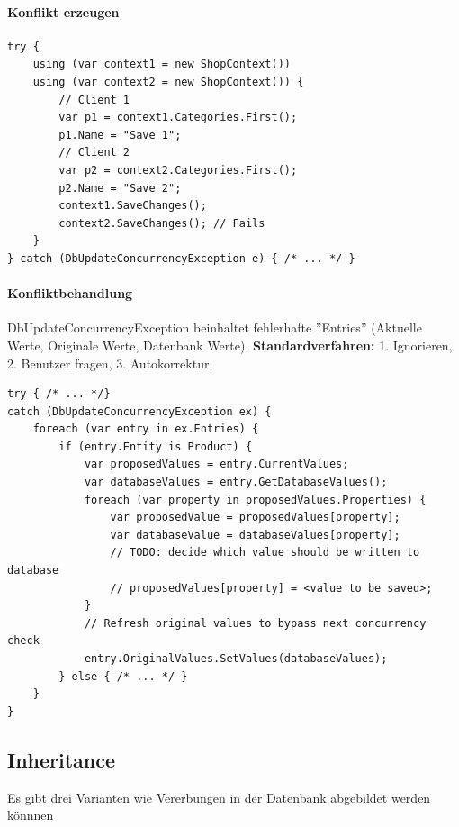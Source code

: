 \documentclass[
a4paper,
oneside,
10pt,
fleqn,
headsepline,
toc=listofnumbered, 
bibliography=totocnumbered]{scrartcl}
\begin{document}
\paragraph{Konflikt erzeugen}
\begin{lstlisting}
try {
    using (var context1 = new ShopContext())
    using (var context2 = new ShopContext()) {
        // Client 1
        var p1 = context1.Categories.First();
        p1.Name = "Save 1";
        // Client 2
        var p2 = context2.Categories.First();
        p2.Name = "Save 2";
        context1.SaveChanges();
        context2.SaveChanges(); // Fails
    }
} catch (DbUpdateConcurrencyException e) { /* ... */ }
\end{lstlisting}

\paragraph{Konfliktbehandlung}
DbUpdateConcurrencyException beinhaltet fehlerhafte ''Entries'' (Aktuelle Werte, Originale Werte, Datenbank Werte). \textbf{Standardverfahren:} 1. Ignorieren, 2. Benutzer fragen, 3. Autokorrektur.

\begin{lstlisting}
try { /* ... */}
catch (DbUpdateConcurrencyException ex) {
    foreach (var entry in ex.Entries) {
        if (entry.Entity is Product) {
            var proposedValues = entry.CurrentValues;
            var databaseValues = entry.GetDatabaseValues();
            foreach (var property in proposedValues.Properties) {
                var proposedValue = proposedValues[property];
                var databaseValue = databaseValues[property];
                // TODO: decide which value should be written to database
                // proposedValues[property] = <value to be saved>;
            }
            // Refresh original values to bypass next concurrency check
            entry.OriginalValues.SetValues(databaseValues);
        } else { /* ... */ }
    }
}
\end{lstlisting}

\subsection{Inheritance}
Es gibt drei Varianten wie Vererbungen in der Datenbank abgebildet werden könnnen
\end{document}
